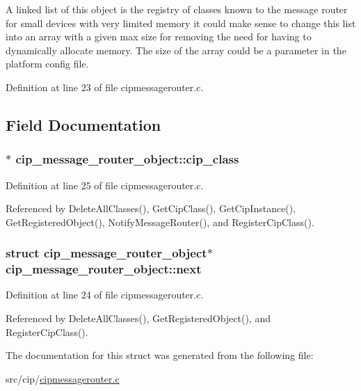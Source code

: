 \-A linked list of this object is the registry of classes known to the message router for small devices with very limited memory it could make sense to change this list into an array with a given max size for removing the need for having to dynamically allocate memory. \-The size of the array could be a parameter in the platform config file. 

\-Definition at line 23 of file cipmessagerouter.\-c.



\subsection{\-Field \-Documentation}
\hypertarget{structcip__message__router__object_a440815cdd66b94380266bbc5e1a9a459}{
\subsubsection[{cip\-\_\-class}]{$\ast$ {\bf cip\-\_\-message\-\_\-router\-\_\-object\-::cip\-\_\-class}}}\label{d2/d6d/structcip__message__router__object_a440815cdd66b94380266bbc5e1a9a459}


\-Definition at line 25 of file cipmessagerouter.\-c.



\-Referenced by \-Delete\-All\-Classes(), \-Get\-Cip\-Class(), \-Get\-Cip\-Instance(), \-Get\-Registered\-Object(), \-Notify\-Message\-Router(), and \-Register\-Cip\-Class().

\hypertarget{structcip__message__router__object_ae5fe968ec24697e92f45cceb93cc437f}{
\subsubsection[{next}]{\setlength{\rightskip}{0pt plus 5cm}struct {\bf cip\-\_\-message\-\_\-router\-\_\-object}$\ast$ {\bf cip\-\_\-message\-\_\-router\-\_\-object\-::next}}}\label{d2/d6d/structcip__message__router__object_ae5fe968ec24697e92f45cceb93cc437f}


\-Definition at line 24 of file cipmessagerouter.\-c.



\-Referenced by \-Delete\-All\-Classes(), \-Get\-Registered\-Object(), and \-Register\-Cip\-Class().



\-The documentation for this struct was generated from the following file\-:\begin{DoxyCompactItemize}
\item 
src/cip/\hyperlink{cipmessagerouter_8c}{cipmessagerouter.\-c}\end{DoxyCompactItemize}
